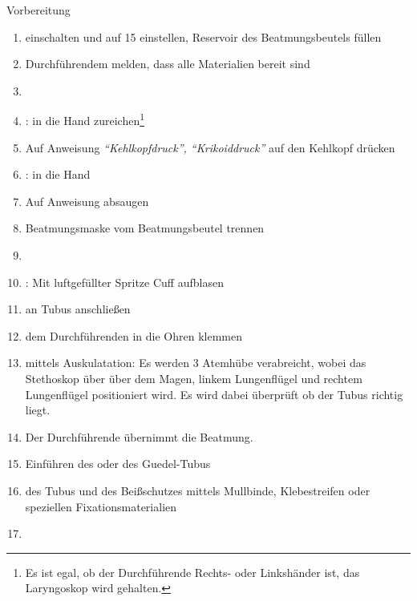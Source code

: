 \begin{ProcedureStepsWide}{Vorbereitung}
\begin{enumerate}
  \item {} einschalten und auf
  15{\LPerMin*} einstellen, Reservoir des Beatmungsbeutels
  füllen
  \item Durchführendem melden, dass alle Materialien bereit sind
  \item {}
  \item {}: in die 
  Hand zureichen\footnote{Es ist egal, ob der Durchführende
  Rechts- oder Linkshänder ist, das Laryngoskop wird
   gehalten.}
  \item Auf Anweisung \emph{\enquote{Kehlkopfdruck},
  \enquote{Krikoiddruck}} auf den Kehlkopf drücken
  \item {}: in die  Hand
  \item Auf Anweisung absaugen
  \item Beatmungsmaske vom Beatmungsbeutel trennen
  \item {}
  \item {}: Mit luftgefüllter Spritze Cuff
  aufblasen
  \item {} an Tubus anschließen
  \item {} dem Durchführenden in die Ohren
  klemmen
  \item {} mittels Auskulatation: Es werden
  3 Atemhübe verabreicht, wobei das Stethoskop über über dem Magen, linkem Lungenflügel und
  rechtem Lungenflügel positioniert wird. Es wird dabei
  überprüft ob der Tubus richtig liegt.
  \item Der Durchführende übernimmt die Beatmung.
  \item Einführen des  oder des Guedel-Tubus
  \item {} des Tubus und des Beißschutzes
  mittels Mullbinde, Klebestreifen oder speziellen
  Fixationsmaterialien
  \item {}
\end{enumerate}
\end{ProcedureStepsWide}


